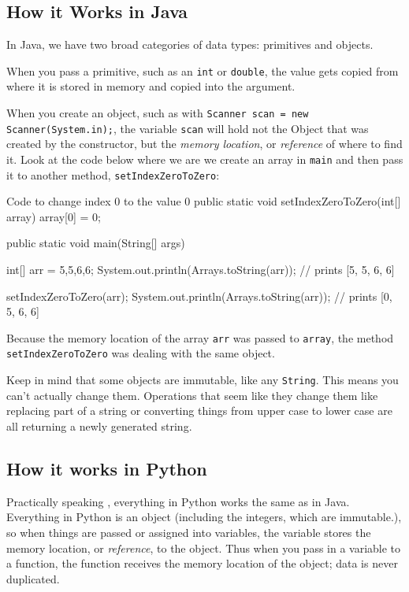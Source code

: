 \subsection{How it Works in Java}
In Java, we have two broad categories of data types: primitives and objects.

When you pass a primitive, such as an \texttt{int} or \texttt{double}, the value gets copied from where it is stored in memory and copied into the argument.

When you create an object, such as with 
\texttt{Scanner scan = new Scanner(System.in);},
the variable \texttt{scan} will hold not the Object that was created by the constructor, but the \textit{memory location}, or  \textit{reference} of where to find it.
Look at the code below where we are we create an array in \texttt{main} and then pass it to another method, \texttt{setIndexZeroToZero}:

\begin{javacode}{Code to change index 0 to the value 0}
public static void setIndexZeroToZero(int[] array) {
	array[0] = 0;
}

public static void main(String[] args) {
	int[] arr = {5,5,6,6};
	System.out.println(Arrays.toString(arr));
	// prints [5, 5, 6, 6]
	
	setIndexZeroToZero(arr);
	System.out.println(Arrays.toString(arr));
	// prints [0, 5, 6, 6]
}

\end{javacode}

Because the memory location of the array \texttt{arr} was passed to \texttt{array}, the method \texttt{setIndexZeroToZero} was dealing with the same object. 


Keep in mind that some objects are immutable, like any \texttt{String}.  
This means you can't actually change them.  
Operations that seem like they change them like replacing part of a string or converting things from upper case to lower case are all returning a newly generated string.
\subsection{How it works in Python}

Practically  speaking , everything in Python works the same as in Java.
Everything in Python is an object (including the integers, which are immutable.), so when things are passed or assigned into variables, the variable stores the memory location, or \textit{reference}, to the object.  
Thus when you pass in a variable to a function, the function receives the memory location of the object; data is never duplicated.